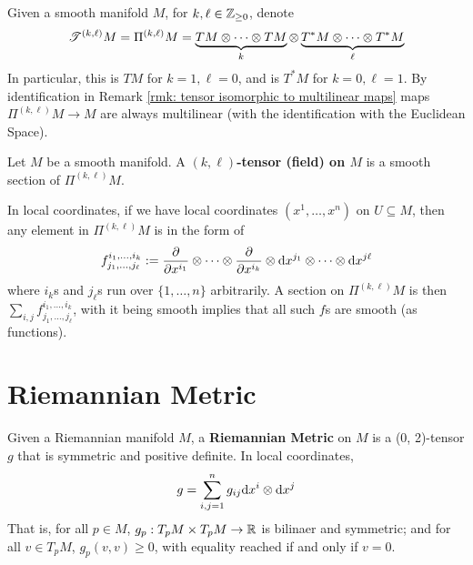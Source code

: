 \documentclass{article}
\begin{document}
\begin{notation}
    Given a smooth manifold $M$, for $k, \ell \in \mathbb{Z}_{\geq 0}$, denote
    \[
        \mathscr{T}^{(k, \ell)} M = \Pi^{(k, \ell)} M = \underbrace{TM \otimes \cdots \otimes TM}_{k} \otimes \underbrace{T^{\ast}M \otimes \cdots \otimes T^{\ast} M}_{\ell}
    \]
    In particular, this is $TM$ for $k = 1, \ell = 0$, and is $T^{\ast}M$ for $k = 0, \ell = 1$. By identification in Remark \ref{rmk: tensor isomorphic to multilinear maps} maps $\Pi^{(k, \ell)} M \to M$ are always multilinear (with the identification with the Euclidean Space). 
\end{notation}

\begin{definition}
    Let $M$ be a smooth manifold. A \textbf{$(k, \ell)$-tensor (field) on $M$} is a smooth section of $\Pi^{(k, \ell)} M$.
\end{definition}

\textstart
In local coordinates, if we have local coordinates $(x^1, \dots, x^n)$ on $U \subseteq M$, then any element in $\Pi^{(k, \ell)} M$ is in the form of 
\[
    f_{j_1, \dots, j_{\ell}}^{i_1, \dots, i_k} := \frac{\partial}{\partial x^{i_1}} \otimes \cdots \otimes \frac{\partial}{\partial x^{i_k}} \otimes \mathrm{d} x^{j_1} \otimes \cdots \otimes \mathrm{d} x^{j \ell}
\]
where $i_k$s and $j_{\ell}$s run over $\{ 1, \dots, n \}$ arbitrarily. A section on $\Pi^{(k, \ell)} M$ is then $\sum_{i, j} f_{j_1, \dots, j_{\ell}}^{i_1, \dots, i_k}$, with it being smooth implies that all such $f$s are smooth (as functions).

\section{Riemannian Metric}

\begin{definition}
    Given a Riemannian manifold $M$, a \textbf{Riemannian Metric} on $M$ is a (0, 2)-tensor $g$ that is symmetric and positive definite. In local coordinates,
    \[
        g = \sum_{i, j = 1}^n g_{ij} \mathrm{d} x^i \otimes \mathrm{d} x^j
    \]
    That is, for all $p \in M$, $g_p: T_p M \times T_p M \to \mathbb{R}$ is bilinaer and symmetric; and for all $v \in T_p M$, $g_p (v, v) \geq 0$, with equality reached if and only if $v = 0$.
\end{definition}
\end{document}
